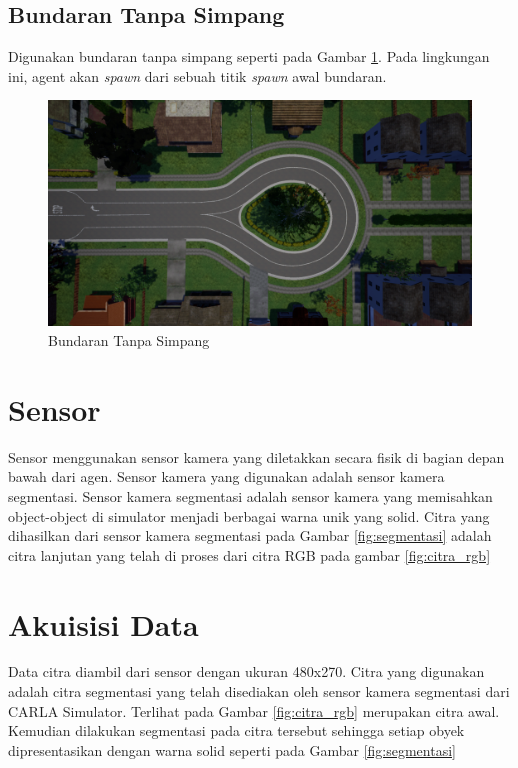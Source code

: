 \subsection{Bundaran Tanpa Simpang}
Digunakan bundaran tanpa simpang seperti pada Gambar  \ref{fig:bundaran_tanpa_simpang}. Pada lingkungan ini, agent akan \textit{spawn }dari sebuah titik \textit{spawn} awal bundaran.
\begin{figure}[H] 
	\centering
	\includegraphics[width=.7\linewidth]{images/bundaran_tanpa_simpang}
	\caption{Bundaran Tanpa Simpang}
	\label{fig:bundaran_tanpa_simpang}
\end{figure}

\section{Sensor}
\label{sec:sensor}
Sensor menggunakan sensor kamera yang diletakkan secara fisik di bagian depan bawah dari agen. Sensor kamera yang digunakan adalah sensor kamera segmentasi. Sensor kamera segmentasi adalah sensor kamera yang memisahkan object-object di simulator menjadi berbagai warna unik yang solid. Citra yang dihasilkan dari sensor kamera segmentasi pada Gambar \ref{fig:segmentasi} adalah citra lanjutan yang telah di proses dari citra RGB pada gambar \ref{fig:citra_rgb}


\section{Akuisisi Data}
\label{sec:akuisisi_data}
Data citra diambil dari sensor dengan ukuran 480x270. Citra yang digunakan adalah citra segmentasi yang telah disediakan oleh sensor kamera segmentasi dari CARLA Simulator. Terlihat pada Gambar \ref{fig:citra_rgb} merupakan citra awal. Kemudian dilakukan segmentasi pada citra tersebut sehingga setiap obyek dipresentasikan dengan warna solid seperti pada Gambar \ref{fig:segmentasi}

